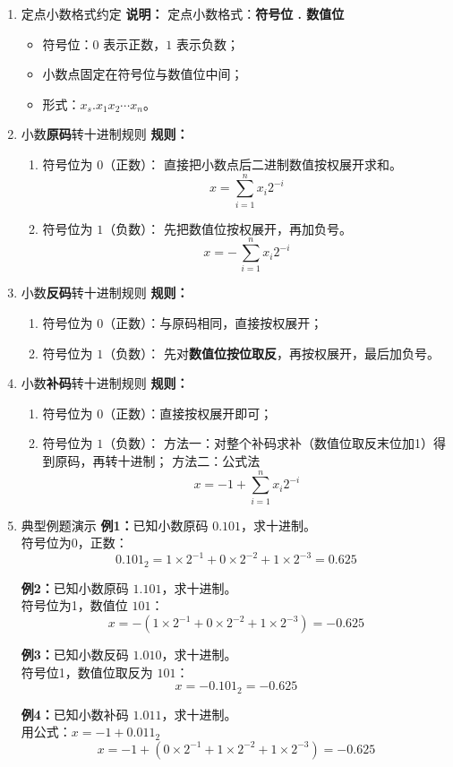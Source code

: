 \documentclass{article}
\begin{document}
\begin{enumerate}[label=\arabic*.]
\item 定点小数格式约定
\textbf{说明：}
定点小数格式：\textbf{符号位 . 数值位}
\begin{itemize}
    \item 符号位：$0$ 表示正数，$1$ 表示负数；
    \item 小数点固定在符号位与数值位中间；
    \item 形式：$x_s.x_1x_2\cdots x_n$。
\end{itemize}

\item 小数\textbf{原码}转十进制规则
\textbf{规则：}
\begin{enumerate}
    \item 符号位为 $0$（正数）：
    直接把小数点后二进制数值按权展开求和。
    \[
    x = \sum_{i=1}^n x_i 2^{-i}
    \]
    \item 符号位为 $1$（负数）：
    先把数值位按权展开，再加负号。
    \[
    x = -\,\sum_{i=1}^n x_i 2^{-i}
    \]
\end{enumerate}

\item 小数\textbf{反码}转十进制规则
\textbf{规则：}
\begin{enumerate}
    \item 符号位为 $0$（正数）：与原码相同，直接按权展开；
    \item 符号位为 $1$（负数）：
    先对\textbf{数值位按位取反}，再按权展开，最后加负号。
\end{enumerate}

\item 小数\textbf{补码}转十进制规则
\textbf{规则：}
\begin{enumerate}
    \item 符号位为 $0$（正数）：直接按权展开即可；
    \item 符号位为 $1$（负数）：
    方法一：对整个补码求补（数值位取反末位加1）得到原码，再转十进制；
    方法二：公式法
    \[
    x = -1 + \sum_{i=1}^n x_i 2^{-i}
    \]
\end{enumerate}

\item 典型例题演示
\textbf{例1：}已知小数原码 $0.101$，求十进制。\\
符号位为0，正数：
\[
0.101_2 = 1\times 2^{-1}+0\times 2^{-2}+1\times 2^{-3} = 0.625
\]

\textbf{例2：}已知小数原码 $1.101$，求十进制。\\
符号位为1，数值位 $101$：
\[
x = -(1\times 2^{-1}+0\times 2^{-2}+1\times 2^{-3}) = -0.625
\]

\textbf{例3：}已知小数反码 $1.010$，求十进制。\\
符号位1，数值位取反为 $101$：
\[
x = -0.101_2 = -0.625
\]

\textbf{例4：}已知小数补码 $1.011$，求十进制。\\
用公式：$x=-1 + 0.011_2$
\[
x = -1 + (0\times 2^{-1}+1\times 2^{-2}+1\times 2^{-3}) = -0.625
\]

\end{enumerate}
\end{document}
